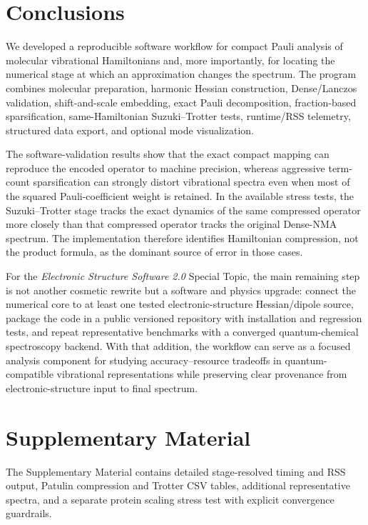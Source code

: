 \documentclass[aip,jcp,reprint,amsmath,amssymb,floatfix]{revtex4-2}
\begin{document}
\section{Conclusions}
We developed a reproducible software workflow for compact Pauli analysis of molecular vibrational Hamiltonians and, more importantly, for locating the numerical stage at which an approximation changes the spectrum. The program combines molecular preparation, harmonic Hessian construction, Dense/Lanczos validation, shift-and-scale embedding, exact Pauli decomposition, fraction-based sparsification, same-Hamiltonian Suzuki--Trotter tests, runtime/RSS telemetry, structured data export, and optional mode visualization.

The software-validation results show that the exact compact mapping can reproduce the encoded operator to machine precision, whereas aggressive term-count sparsification can strongly distort vibrational spectra even when most of the squared Pauli-coefficient weight is retained. In the available stress tests, the Suzuki--Trotter stage tracks the exact dynamics of the same compressed operator more closely than that compressed operator tracks the original Dense-NMA spectrum. The implementation therefore identifies Hamiltonian compression, not the product formula, as the dominant source of error in those cases.

For the \emph{Electronic Structure Software 2.0} Special Topic, the main remaining step is not another cosmetic rewrite but a software and physics upgrade: connect the numerical core to at least one tested electronic-structure Hessian/dipole source, package the code in a public versioned repository with installation and regression tests, and repeat representative benchmarks with a converged quantum-chemical spectroscopy backend. With that addition, the workflow can serve as a focused analysis component for studying accuracy--resource tradeoffs in quantum-compatible vibrational representations while preserving clear provenance from electronic-structure input to final spectrum.

\section*{Supplementary Material}
The Supplementary Material contains detailed stage-resolved timing and RSS output, Patulin compression and Trotter CSV tables, additional representative spectra, and a separate protein scaling stress test with explicit convergence guardrails.
\end{document}
